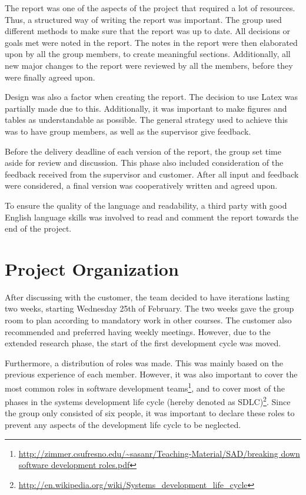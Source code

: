 The report was one of the aspects of the project that required a lot of resources. Thus, a structured way of writing the report was important. The group used different methods to make sure that the report was up to date. All decisions or goals met were noted in the report. The notes in the report were then elaborated upon by all the group members, to create meaningful sections. Additionally, all new major changes to the report were reviewed by all the members, before they were finally agreed upon.

Design was also a factor when creating the report. The decision to use Latex was partially made due to this. Additionally, it was important to make figures and tables as understandable as possible. The general strategy used to achieve this was to have group members, as well as the supervisor give feedback.

Before the delivery deadline of each version of the report, the group set time aside for review and discussion. This phase also included consideration of the feedback received from the supervisor and customer. After all input and feedback were considered, a final version was cooperatively written and agreed upon.

To ensure the quality of the language and readability, a third party with good English language skills was involved to read and comment the report towards the end of the project.

\section{Project Organization}
\label{sec:process_and_methodology-project_organization}

After discussing with the customer, the team decided to have iterations lasting two weeks, starting Wednesday 25th of February. The two weeks gave the group room to plan according to mandatory work in other courses. The customer also recommended and preferred having weekly meetings. However, due to the extended research phase, the start of the first development cycle was moved.

Furthermore, a distribution of roles was made. This was mainly based on the previous experience of each member. However, it was also important to cover the most common roles in software development teams\footnote{\url{http://zimmer.csufresno.edu/~sasanr/Teaching-Material/SAD/breaking down software development roles.pdf}}, and to cover most of the phases in the systems development life cycle (hereby denoted as SDLC)\footnote{\url{http://en.wikipedia.org/wiki/Systems_development_life_cycle}}. Since the group only consisted of six people, it was important to declare these roles to prevent any aspects of the development life cycle to be neglected.

